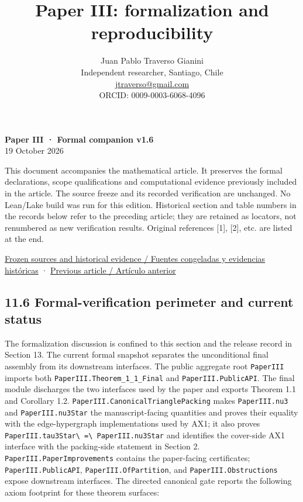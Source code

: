 \documentclass[english,11pt,a4paper]{article}
\title{Paper III: formalization and reproducibility}
\author{Juan Pablo Traverso Gianini\\\small Independent researcher, Santiago, Chile\\\small \href{mailto:jtraverso@gmail.com}{jtraverso@gmail.com}\\\small ORCID: 0009-0003-6068-4096}
\date{}
\begin{document}
\raggedbottom
\maketitle
\textbf{Paper III · Formal companion v1.6}\\
19 October 2026

This document accompanies the mathematical article. It preserves the
formal declarations, scope qualifications and computational evidence
previously included in the article. The source freeze and its recorded
verification are unchanged. No Lean/Lake build was run for this edition.
Historical section and table numbers in the records below refer to the
preceding article; they are retained as locators, not renumbered as new
verification results. Original references {[}1{]}, {[}2{]}, etc. are
listed at the end.

\href{https://github.com/jtraverso/erdos-81-chordal-clique-partitions/tree/eb335845bfa23375d5040ea31fc4f4b366346287/preprints/PAPER_III/05_formalization}{Frozen
sources and historical evidence / Fuentes congeladas y evidencias
históricas} ·
\href{https://github.com/jtraverso/erdos-81-chordal-clique-partitions/tree/eb335845bfa23375d5040ea31fc4f4b366346287/preprints/PAPER_III/01_manuscript}{Previous
article / Artículo anterior}

\subsection{11.6 Formal-verification perimeter and current
status}\label{formal-verification-perimeter-and-current-status}

The formalization discussion is confined to this section and the release
record in Section 13. The current formal snapshot separates the
unconditional final assembly from its downstream interfaces. The public
aggregate root \nolinkurl{PaperIII} imports both
\nolinkurl{PaperIII.Theorem_1_1_Final} and \nolinkurl{PaperIII.PublicAPI}.
The final module discharges the two interfaces used by the paper and
exports Theorem 1.1 and Corollary 1.2.
\nolinkurl{PaperIII.CanonicalTrianglePacking} makes \nolinkurl{PaperIII.nu3}
and \nolinkurl{PaperIII.nu3Star} the manuscript-facing quantities and
proves their equality with the edge-hypergraph implementations used by
AX1; it also proves \nolinkurl{PaperIII.tau3Star\ =\ PaperIII.nu3Star} and
identifies the cover-side AX1 interface with the packing-side statement
in Section 2. \nolinkurl{PaperIII.PaperImprovements} contains the
paper-facing certificates; \nolinkurl{PaperIII.PublicAPI},
\nolinkurl{PaperIII.OfPartition}, and \nolinkurl{PaperIII.Obstructions} expose
downstream interfaces. The directed canonical gate reports the following
axiom footprint for these theorem surfaces:
\end{document}

